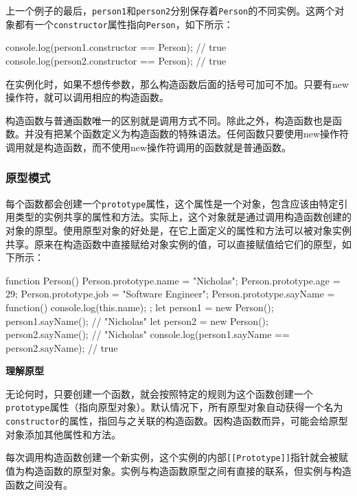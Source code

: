 上一个例子的最后，\texttt{person1}和\texttt{person2}分别保存着\texttt{Person}的不同实例。这两个对象都有一个\texttt{constructor}属性指向\texttt{Person}，如下所示：

\begin{JavaScript}
console.log(person1.constructor == Person);  // true 
console.log(person2.constructor == Person);  // true 
\end{JavaScript}

在实例化时，如果不想传参数，那么构造函数后面的括号可加可不加。只要有new操作符，就可以调用相应的构造函数。

构造函数与普通函数唯一的区别就是调用方式不同。除此之外，构造函数也是函数。并没有把某个函数定义为构造函数的特殊语法。任何函数只要使用new操作符调用就是构造函数，而不使用new操作符调用的函数就是普通函数。

\subsubsection{原型模式}

每个函数都会创建一个\texttt{prototype}属性，这个属性是一个对象，包含应该由特定引用类型的实例共享的属性和方法。实际上，这个对象就是通过调用构造函数创建的对象的原型。使用原型对象的好处是，在它上面定义的属性和方法可以被对象实例共享。原来在构造函数中直接赋给对象实例的值，可以直接赋值给它们的原型，如下所示：

\begin{JavaScript}
function Person() {} 
Person.prototype.name = "Nicholas"; 
Person.prototype.age = 29; 
Person.prototype.job = "Software Engineer"; 
Person.prototype.sayName = function() {   
    console.log(this.name);  
}; 
let person1 = new Person(); 
person1.sayName(); // "Nicholas" 
let person2 = new Person(); 
person2.sayName(); // "Nicholas" 
console.log(person1.sayName == person2.sayName); // true 
\end{JavaScript}


\noindent\textbf{理解原型}

无论何时，只要创建一个函数，就会按照特定的规则为这个函数创建一个\texttt{prototype}属性（指向原型对象）。默认情况下，所有原型对象自动获得一个名为\texttt{constructor}的属性，指回与之关联的构造函数。因构造函数而异，可能会给原型对象添加其他属性和方法。

每次调用构造函数创建一个新实例，这个实例的内部\texttt{[[Prototype]]}指针就会被赋值为构造函数的原型对象。实例与构造函数原型之间有直接的联系，但实例与构造函数之间没有。

